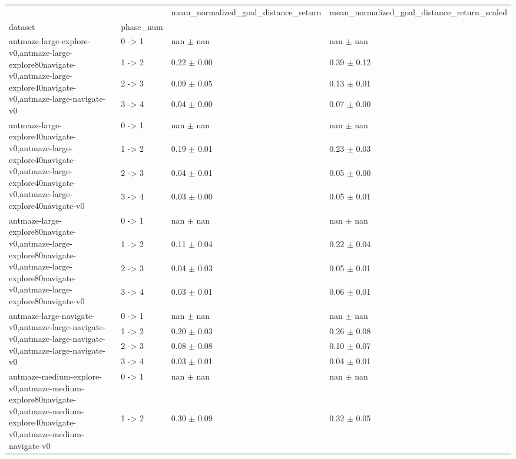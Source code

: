 \begin{tabular}{llll}
\toprule
 &  & mean_normalized_goal_distance_return & mean_normalized_goal_distance_return_scaled \\
dataset & phase_num &  &  \\
\midrule
\multirow[t]{4}{*}{antmaze-large-explore-v0,antmaze-large-explore80navigate-v0,antmaze-large-explore40navigate-v0,antmaze-large-navigate-v0} & 0 -> 1 & nan $\pm$ nan & nan $\pm$ nan \\
 & 1 -> 2 & 0.22 $\pm$ 0.00 & 0.39 $\pm$ 0.12 \\
 & 2 -> 3 & 0.09 $\pm$ 0.05 & 0.13 $\pm$ 0.01 \\
 & 3 -> 4 & 0.04 $\pm$ 0.00 & 0.07 $\pm$ 0.00 \\
\cline{1-4}
\multirow[t]{4}{*}{antmaze-large-explore40navigate-v0,antmaze-large-explore40navigate-v0,antmaze-large-explore40navigate-v0,antmaze-large-explore40navigate-v0} & 0 -> 1 & nan $\pm$ nan & nan $\pm$ nan \\
 & 1 -> 2 & 0.19 $\pm$ 0.01 & 0.23 $\pm$ 0.03 \\
 & 2 -> 3 & 0.04 $\pm$ 0.01 & 0.05 $\pm$ 0.00 \\
 & 3 -> 4 & 0.03 $\pm$ 0.00 & 0.05 $\pm$ 0.01 \\
\cline{1-4}
\multirow[t]{4}{*}{antmaze-large-explore80navigate-v0,antmaze-large-explore80navigate-v0,antmaze-large-explore80navigate-v0,antmaze-large-explore80navigate-v0} & 0 -> 1 & nan $\pm$ nan & nan $\pm$ nan \\
 & 1 -> 2 & 0.11 $\pm$ 0.04 & 0.22 $\pm$ 0.04 \\
 & 2 -> 3 & 0.04 $\pm$ 0.03 & 0.05 $\pm$ 0.01 \\
 & 3 -> 4 & 0.03 $\pm$ 0.01 & 0.06 $\pm$ 0.01 \\
\cline{1-4}
\multirow[t]{4}{*}{antmaze-large-navigate-v0,antmaze-large-navigate-v0,antmaze-large-navigate-v0,antmaze-large-navigate-v0} & 0 -> 1 & nan $\pm$ nan & nan $\pm$ nan \\
 & 1 -> 2 & 0.20 $\pm$ 0.03 & 0.26 $\pm$ 0.08 \\
 & 2 -> 3 & 0.08 $\pm$ 0.08 & 0.10 $\pm$ 0.07 \\
 & 3 -> 4 & 0.03 $\pm$ 0.01 & 0.04 $\pm$ 0.01 \\
\cline{1-4}
\multirow[t]{4}{*}{antmaze-medium-explore-v0,antmaze-medium-explore80navigate-v0,antmaze-medium-explore40navigate-v0,antmaze-medium-navigate-v0} & 0 -> 1 & nan $\pm$ nan & nan $\pm$ nan \\
 & 1 -> 2 & 0.30 $\pm$ 0.09 & 0.32 $\pm$ 0.05 \\

\end{tabular}
